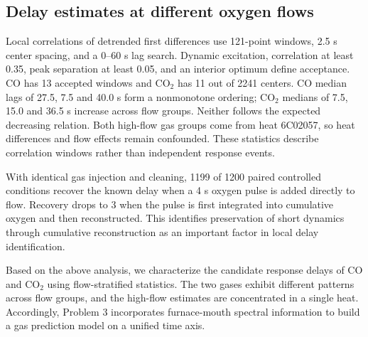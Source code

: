 \subsection{Delay estimates at different oxygen flows}
Local correlations of detrended first differences use 121-point windows, 2.5 s center spacing, and a 0--60 s lag search. Dynamic excitation, correlation at least 0.35, peak separation at least 0.05, and an interior optimum define acceptance. CO has 13 accepted windows and CO$_2$ has 11 out of 2241 centers. CO median lags of 27.5, 7.5 and 40.0 s form a nonmonotone ordering; CO$_2$ medians of 7.5, 15.0 and 36.5 s increase across flow groups. Neither follows the expected decreasing relation. Both high-flow gas groups come from heat 6C02057, so heat differences and flow effects remain confounded. These statistics describe correlation windows rather than independent response events.

With identical gas injection and cleaning, 1199 of 1200 paired controlled conditions recover the known delay when a 4 s oxygen pulse is added directly to flow. Recovery drops to 3 when the pulse is first integrated into cumulative oxygen and then reconstructed. This identifies preservation of short dynamics through cumulative reconstruction as an important factor in local delay identification.

Based on the above analysis, we characterize the candidate response delays of CO and CO$_2$ using flow-stratified statistics. The two gases exhibit different patterns across flow groups, and the high-flow estimates are concentrated in a single heat. Accordingly, Problem 3 incorporates furnace-mouth spectral information to build a gas prediction model on a unified time axis.
